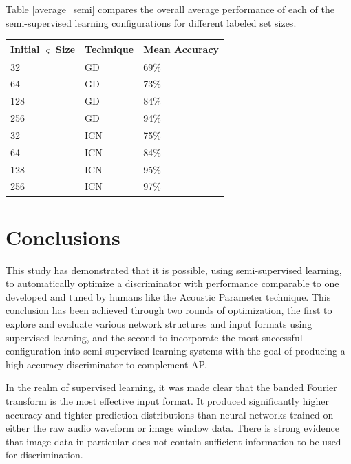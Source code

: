 \documentclass[10pt]{article}
\begin{document}
Table \ref{average_semi} compares the overall average performance of each of the semi-supervised learning configurations for different labeled set sizes.

\begin{minipage}{\textwidth}
    \begin{center}
         \label{average_semi}
        \begin{tabular}{|l|l|l|}
            \hline
            Initial $\varsigma$ Size & Technique & Mean Accuracy \\
            \hline
            32 & GD & 69\% \\
            \hline
            64 & GD & 73\% \\
            \hline
            128 & GD & 84\% \\
            \hline
            256 & GD & 94\% \\
            \hline
            32 & ICN & 75\% \\
            \hline
            64 & ICN & 84\% \\
            \hline
            128 & ICN & 95\% \\
            \hline
            256 & ICN & 97\% \\
            \hline
        \end{tabular}
    \end{center}
\end{minipage}

\section{Conclusions}

This study has demonstrated that it is possible, using semi-supervised learning, to automatically optimize a discriminator with performance comparable to one developed and tuned by humans like the Acoustic Parameter technique. This conclusion has been achieved through two rounds of optimization, the first to explore and evaluate various network structures and input formats using supervised learning, and the second to incorporate the most successful configuration into semi-supervised learning systems with the goal of producing a high-accuracy discriminator to complement AP.

In the realm of supervised learning, it was made clear that the banded Fourier transform is the most effective input format. It produced significantly higher accuracy and tighter prediction distributions than neural networks trained on either the raw audio waveform or image window data. There is strong evidence that image data in particular does not contain sufficient information to be used for discrimination.
\end{document}
